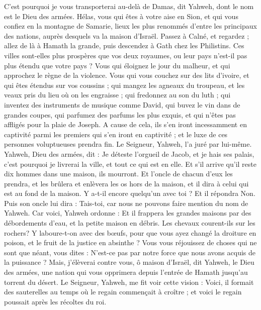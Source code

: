\begin{multicols}{2}
C'est pourquoi je vous transporterai au-delà de Damas, dit Yahweh, dont le nom est le Dieu des armées.
\VerseOne{}Hélas, vous qui êtes à votre aise en Sion, et qui vous confiez en la montagne de Samarie, lieux les plus renommés d'entre les principaux des nations, auprès desquels va la maison d'Israël.
Passez à Calné, et regardez ; allez de là à Hamath la grande, puis descendez à Gath chez les Philistins. Ces villes sont-elles plus prospères que vos deux royaumes, ou leur pays n'est-il pas plus étendu que votre pays ?
Vous qui éloignez le jour du malheur, et qui approchez le règne de la violence.
Vous qui vous couchez sur des lits d'ivoire, et qui êtes étendus sur vos coussins ; qui mangez les agneaux du troupeau, et les veaux pris du lieu où on les engraisse ;
qui fredonnez au son du luth ; qui inventez des instruments de musique comme David,
qui buvez le vin dans de grandes coupes, qui parfumez des parfums les plus exquis, et qui n'êtes pas affligés pour la plaie de Joseph.
A cause de cela, ils s'en iront incessamment en captivité parmi les premiers qui s'en iront en captivité ; et le luxe de ces personnes voluptueuses prendra fin.  
Le Seigneur, Yahweh, l'a juré par lui-même. Yahweh, Dieu des armées, dit : Je déteste l'orgueil de Jacob, et je hais ses palais, c'est pourquoi je livrerai la ville, et tout ce qui est en elle.
Et s'il arrive qu'il reste dix hommes dans une maison, ils mourront.
Et l'oncle de chacun d'eux les prendra, et les brûlera et enlèvera les os hors de la maison, et il dira à celui qui est au fond de la maison. Y a-t-il encore quelqu’un avec toi ? Et il répondra Non. Puis son oncle lui dira : Tais-toi, car nous ne pouvons faire mention du nom de Yahweh.
Car voici, Yahweh ordonne : Et il frappera les grandes maisons par des débordements d'eau, et la petite maison en débris.
Les chevaux courent-ils sur les rochers? Y laboure-t-on avec des bœufs, pour que vous ayez changé la droiture en poison, et le fruit de la justice en absinthe ?
Vous vous réjouissez de choses qui ne sont que néant, vous dites : N'est-ce pas par notre force que nous avons acquis de la puissance ?
Mais, j'élèverai contre vous, ô maison d'Israël, dit Yahweh, le Dieu des armées, une nation qui vous opprimera depuis l'entrée de Hamath jusqu'au torrent du désert.
\VerseOne{}Le Seigneur, Yahweh, me fit voir cette vision : Voici, il formait des sauterelles au temps où le regain commençait à croître ; et voici le regain poussait après les récoltes du roi.

\end{multicols}
